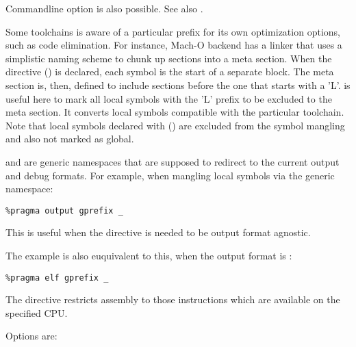 Commandline option is also possible. See also .

Some toolchains is aware of a particular prefix for its own optimization
options, such as code elimination. For instance, Mach-O backend has a
linker that uses a simplistic naming scheme to chunk up sections into a
meta section. When the  directive
() is declared, each symbol is the start of a
separate block. The meta section is, then, defined to include sections
before the one that starts with a 'L'.  is useful here to
mark all local symbols with the 'L' prefix to be excluded to the meta
section. It converts local symbols compatible with the particular
toolchain. Note that local symbols declared with 
() are excluded from the symbol mangling and also
not marked as global.


 and  are generic  namespaces
that are supposed to redirect to the current output and debug formats.
For example, when mangling local symbols via the generic namespace:

\begin{lstlisting}
%pragma output gprefix _
\end{lstlisting}

This is useful when the directive is needed to be output format
agnostic.

The example is also euquivalent to this, when the output format is
:

\begin{lstlisting}
%pragma elf gprefix _
\end{lstlisting}



The  directive restricts assembly to those instructions which
are available on the specified CPU.

Options are:

